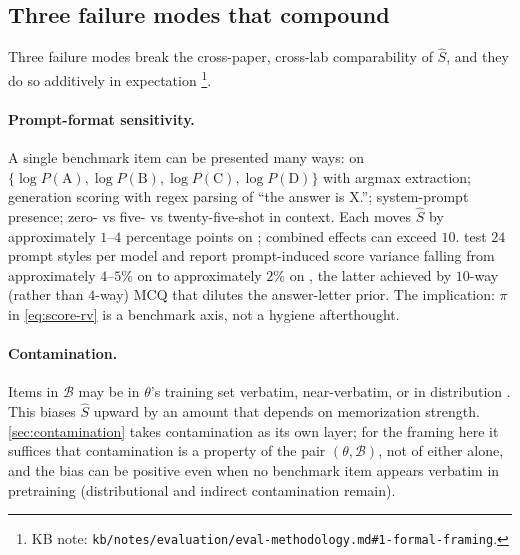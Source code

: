 \subsection{Three failure modes that compound}
\label{sec:measuring-failure-modes}

Three failure modes break the cross-paper, cross-lab comparability of
$\hat{S}$, and they do so additively in expectation%
\footnote{KB note: \nolinkurl{kb/notes/evaluation/eval-methodology.md#1-formal-framing}.}.

\paragraph{Prompt-format sensitivity.} A single benchmark item can be
presented many ways:  on
$\{\log P(\text{A}), \log P(\text{B}), \log P(\text{C}), \log P(\text{D})\}$
with argmax extraction; generation scoring with regex parsing of
``the answer is X.''; system-prompt presence; zero- vs five- vs
twenty-five-shot in context. Each moves $\hat{S}$ by approximately
$1$--$4$ percentage points on ; combined effects can exceed $10$.
\citet{wang2024-mmlu-pro} test $24$ prompt styles per model and report
prompt-induced score variance falling from approximately $4$--$5\%$ on
 to approximately $2\%$ on 
\citep[\S{}abstract]{wang2024-mmlu-pro}, the latter achieved by
$10$-way (rather than $4$-way) MCQ that dilutes the answer-letter
prior. The implication: $\pi$ in \eqref{eq:score-rv} is a benchmark
axis, not a hygiene afterthought.

\paragraph{Contamination.} Items in $\mathcal{B}$ may be in $\theta$'s
training set verbatim, near-verbatim, or in distribution
\citep{contamination-survey-2025}. This biases $\hat{S}$ upward by an
amount that depends on memorization strength. \cref{sec:contamination}
takes contamination as its own layer; for the framing here it
suffices that contamination is a property of the pair
$(\theta, \mathcal{B})$, not of either alone, and the bias can be
positive even when no benchmark item appears verbatim in pretraining
(distributional and indirect contamination remain).

